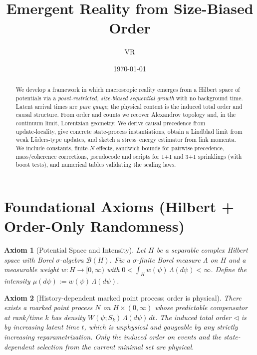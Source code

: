 \documentclass[12pt,a4paper]{article}
\title{Emergent Reality from Size-Biased Order}
\author{VR}
\date{\today}
\newtheorem{axiom}{Axiom}
\begin{document}
\maketitle

\begin{abstract}
  We develop a framework in which macroscopic reality emerges from a Hilbert space of potentials via a
  \emph{poset‐restricted, size‐biased sequential growth} with no background time. Latent arrival times are
  \emph{pure gauge}; the physical content is the induced total order and causal structure. From order and
  counts we recover Alexandrov topology and, in the continuum limit, Lorentzian geometry. We derive causal
  precedence from update‑locality, give concrete state‐process instantiations, obtain a Lindblad limit from
  weak Lüders‐type updates, and sketch a stress–energy estimator from link momenta. We include constants,
  finite‑$N$ effects, sandwich bounds for pairwise precedence, mass/coherence corrections, pseudocode and
  scripts for 1+1 and 3+1 sprinklings (with boost tests), and numerical tables validating the scaling laws.
\end{abstract}
  

\tableofcontents

\section{Foundational Axioms (Hilbert + Order-Only Randomness)}

\begin{axiom}[Potential Space and Intensity]\label{ax:potential}
Let $H$ be a separable complex Hilbert space with Borel $\sigma$-algebra $\mathcal{B}(H)$.
Fix a $\sigma$-finite Borel measure $\Lambda$ on $H$ and a measurable weight $w:H\to[0,\infty)$ with
$0<\int_H w(\psi)\, \Lambda(d\psi)<\infty$.
Define the intensity $\mu(d\psi):=w(\psi)\,\Lambda(d\psi)$.
\end{axiom}

\begin{axiom}[History-dependent marked point process; order is physical]\label{ax:prm}
There exists a marked point process $N$ on $H\times(0,\infty)$ whose \emph{predictable compensator} at rank/time $k$ has density $W(\psi;S_{k})\,\Lambda(d\psi)\,dt$. The induced total order $\triangleleft$ is by increasing latent time $t$, which is unphysical and gaugeable by any strictly increasing reparametrization. Only the induced order on events and the state-dependent selection from the current minimal set are physical.
\end{axiom}
\end{document}
